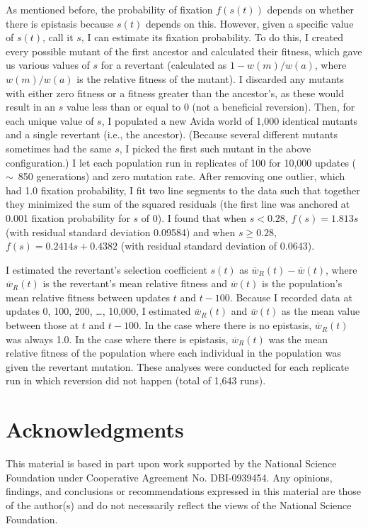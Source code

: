 \begin{doublespace}
As mentioned before, the probability of fixation $f(s(t))$
depends on whether there is epistasis because $s(t)$ depends on this.
%
However, given a specific value of $s(t)$, call it $s$,
I can estimate its fixation probability.
%
To do this, I created every possible mutant of the first ancestor
and calculated their fitness, which gave us various values of $s$
for a revertant (calculated as $1 - w(m) / w(a)$,
where $w(m) / w(a)$ is the relative fitness of the mutant).
%
I discarded any mutants with either zero fitness
or a fitness greater than the ancestor's,
as these would result in an $s$ value less than or equal to 0
(not a beneficial reversion).
%
Then, for each unique value of $s$, I populated a new Avida world of 1,000
identical mutants and a single revertant (i.e., the ancestor).
%
(Because several different mutants sometimes had the same $s$,
I picked the first such mutant in the above configuration.)
%
I let each population run in replicates of 100 for 10,000 updates
($\sim$~850 generations) and zero mutation rate.
%
After removing one outlier, which had 1.0 fixation probability,
I fit two line segments to the data such that together they minimized
the sum of the squared residuals (the first line was anchored
at 0.001 fixation probability for $s$ of 0).
%
I found that when $s < 0.28$, $f(s) = 1.813s$
(with residual standard deviation 0.09584) and when $s \ge 0.28$,
$f(s) = 0.2414s + 0.4382$ (with residual standard deviation of 0.0643).



I estimated the revertant's selection coefficient $s(t)$
as $\overline{w}_{R}(t) - \overline{w}(t)$,
where $\overline{w}_{R}(t)$ is the revertant's mean relative fitness
and $\overline{w}(t)$ is the population's mean relative fitness
between updates $t$ and $t - 100$.
%
Because I recorded data at updates 0, 100, 200, \ldots, 10,000,
I estimated $\overline{w}_{R}(t)$ and $\overline{w}(t)$
as the mean value between those at $t$ and $t - 100$.
%
In the case where there is no epistasis, $\overline{w}_{R}(t)$ was always 1.0.
%
In the case where there is epistasis,
$\overline{w}_{R}(t)$ was the mean relative fitness of the population
where each individual in the population was given the revertant mutation.
%
These analyses were conducted for each replicate run
in which reversion did not happen (total of 1,643 runs).



\section{Acknowledgments}

This material is based in part upon work supported by
the National Science Foundation under Cooperative Agreement No. DBI-0939454.
%
Any opinions, findings, and conclusions or recommendations
expressed in this material are those of the author(s)
and do not necessarily reflect the views of the National Science Foundation.



\end{doublespace}

